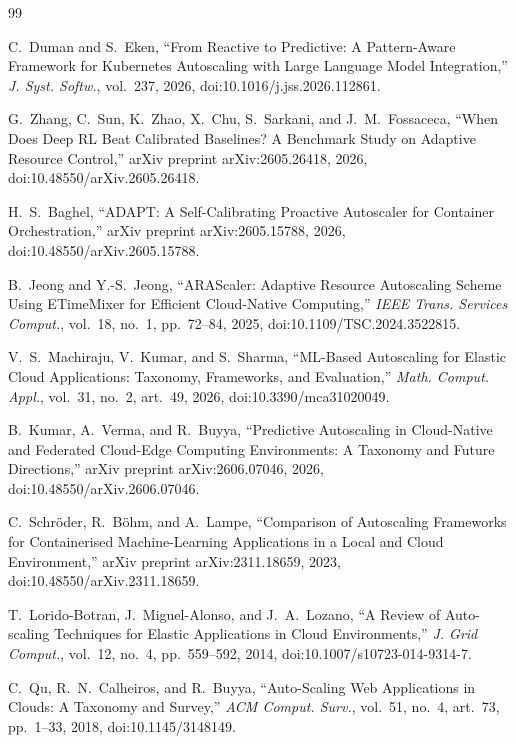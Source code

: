 \documentclass[journal]{IEEEtran}
\begin{document}
\begin{thebibliography}{99}

C.~Duman and S.~Eken, ``From Reactive to Predictive: A Pattern-Aware Framework for Kubernetes Autoscaling with Large Language Model Integration,'' \emph{J. Syst. Softw.}, vol.~237, 2026, doi:10.1016/j.jss.2026.112861.

G.~Zhang, C.~Sun, K.~Zhao, X.~Chu, S.~Sarkani, and J.~M.~Fossaceca, ``When Does Deep RL Beat Calibrated Baselines? A Benchmark Study on Adaptive Resource Control,'' arXiv preprint arXiv:2605.26418, 2026, doi:10.48550/arXiv.2605.26418.

H.~S.~Baghel, ``ADAPT: A Self-Calibrating Proactive Autoscaler for Container Orchestration,'' arXiv preprint arXiv:2605.15788, 2026, doi:10.48550/arXiv.2605.15788.

B.~Jeong and Y.-S.~Jeong, ``ARAScaler: Adaptive Resource Autoscaling Scheme Using ETimeMixer for Efficient Cloud-Native Computing,'' \emph{IEEE Trans. Services Comput.}, vol.~18, no.~1, pp.~72--84, 2025, doi:10.1109/TSC.2024.3522815.

V.~S.~Machiraju, V.~Kumar, and S.~Sharma, ``ML-Based Autoscaling for Elastic Cloud Applications: Taxonomy, Frameworks, and Evaluation,'' \emph{Math. Comput. Appl.}, vol.~31, no.~2, art.~49, 2026, doi:10.3390/mca31020049.

B.~Kumar, A.~Verma, and R.~Buyya, ``Predictive Autoscaling in Cloud-Native and Federated Cloud-Edge Computing Environments: A Taxonomy and Future Directions,'' arXiv preprint arXiv:2606.07046, 2026, doi:10.48550/arXiv.2606.07046.

C.~Schr\"oder, R.~B\"ohm, and A.~Lampe, ``Comparison of Autoscaling Frameworks for Containerised Machine-Learning Applications in a Local and Cloud Environment,'' arXiv preprint arXiv:2311.18659, 2023, doi:10.48550/arXiv.2311.18659.

T.~Lorido-Botran, J.~Miguel-Alonso, and J.~A.~Lozano, ``A Review of Auto-scaling Techniques for Elastic Applications in Cloud Environments,'' \emph{J. Grid Comput.}, vol.~12, no.~4, pp.~559--592, 2014, doi:10.1007/s10723-014-9314-7.

C.~Qu, R.~N.~Calheiros, and R.~Buyya, ``Auto-Scaling Web Applications in Clouds: A Taxonomy and Survey,'' \emph{ACM Comput. Surv.}, vol.~51, no.~4, art.~73, pp.~1--33, 2018, doi:10.1145/3148149.


\end{thebibliography}
\end{document}
